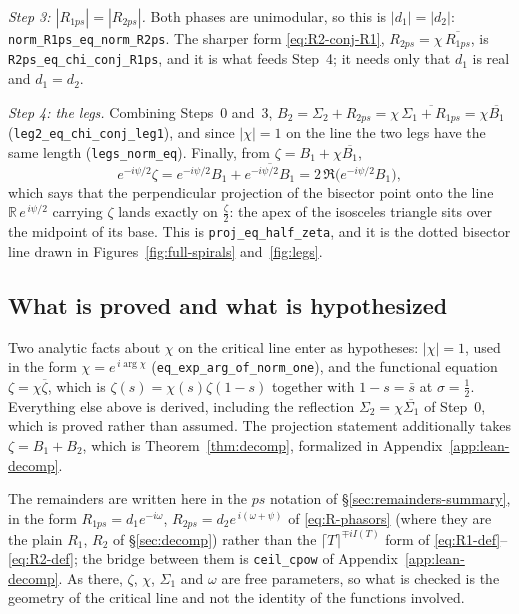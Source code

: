 \documentclass[11pt]{article}
\theoremstyle{definition}
\begin{document}
\emph{Step 3: $|R_{1ps}|=|R_{2ps}|$.} Both phases are unimodular, so this is
$|d_1|=|d_2|$: \texttt{norm\_R1ps\_eq\_\allowbreak norm\_R2ps}. The sharper form
\eqref{eq:R2-conj-R1}, $R_{2ps}=\chi\,\overline{R_{1ps}}$, is
\texttt{R2ps\_eq\_chi\_conj\_R1ps}, and it is what feeds Step~4; it needs only
that $d_1$ is real and $d_1=d_2$.

\emph{Step 4: the legs.} Combining Steps~0 and~3,
$B_2=\Sigma_2+R_{2ps}=\chi\,\overline{\Sigma_1+R_{1ps}}=\chi\overline{B_1}$
(\texttt{leg2\_eq\_\allowbreak chi\_conj\_\allowbreak leg1}), and since $|\chi|=1$ on the line the two
legs have the same length (\texttt{legs\_norm\_eq}). Finally, from
$\zeta=B_1+\chi\overline{B_1}$,
\begin{equation}\label{eq:lean-proj}
e^{-i\psi/2}\zeta
=e^{-i\psi/2}B_1+\overline{e^{-i\psi/2}B_1}
=2\,\Re\bigl(e^{-i\psi/2}B_1\bigr),
\end{equation}
which says that the perpendicular projection of the bisector point onto the line
$\mathbb{R}\,e^{\,i\psi/2}$ carrying $\zeta$ lands exactly on $\tfrac{\zeta}{2}$:
the apex of the isosceles triangle sits over the midpoint of its base. This is
\texttt{proj\_eq\_half\_zeta}, and it is the dotted bisector line drawn in
Figures~\ref{fig:full-spirals} and~\ref{fig:legs}.

\subsection{What is proved and what is hypothesized}

Two analytic facts about $\chi$ on the critical line enter as hypotheses:
$|\chi|=1$, used in the form $\chi=e^{\,i\arg\chi}$
(\texttt{eq\_exp\_arg\_of\_norm\_one}), and the functional equation
$\zeta=\chi\overline{\zeta}$, which is $\zeta(s)=\chi(s)\zeta(1-s)$ together with
$1-s=\bar s$ at $\sigma=\tfrac12$. Everything else above is derived, including
the reflection $\Sigma_2=\chi\overline{\Sigma_1}$ of Step~0, which is proved
rather than assumed. The projection statement additionally takes
$\zeta=B_1+B_2$, which is Theorem~\ref{thm:decomp}, formalized in
Appendix~\ref{app:lean-decomp}.

The remainders are written here in the $ps$ notation of
\S\ref{sec:remainders-summary}, in the form $R_{1ps}=d_1e^{-i\omega}$,
$R_{2ps}=d_2e^{\,i(\omega+\psi)}$ of \eqref{eq:R-phasors} (where they are the
plain $R_1$, $R_2$ of \S\ref{sec:decomp}) rather than the
$\lceil T\rceil^{\mp iI(T)}$ form of
\eqref{eq:R1-def}--\eqref{eq:R2-def}; the bridge between them is
\texttt{ceil\_cpow} of Appendix~\ref{app:lean-decomp}. As there, $\zeta$, $\chi$,
$\Sigma_1$ and $\omega$ are free parameters, so what is checked is the geometry
of the critical line and not the identity of the functions involved.
\end{document}
